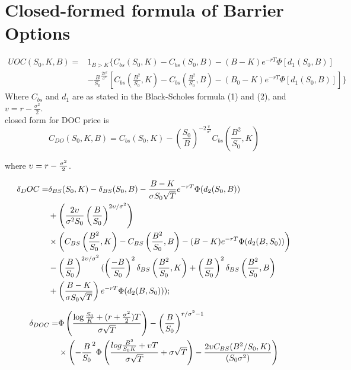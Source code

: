 \documentclass[11pt,a4paper,fleqn,draft]{article}
\begin{document}
\section{Closed-formed formula of Barrier Options}

\begin{equation}
\begin{aligned}
UOC(S_0,K,B) ={} &1_{B>K} \{ C_{bs}(S_0, K)-C_{bs}(S_0,B)-(B-K)e^{-rT}\Phi[d_{1}(S_0,B)] \\
      & -\frac{B}{S_0}^{\frac{2v^2}{\sigma^2}}\left[C_{bs}(\frac{B^2}{S_0}, K)-C_{bs}(\frac{B^2}{S_0}, B) -(B_0-K)e^{-rT}\Phi[d_{1}(S_0,B)]\right]\}
\end{aligned}
\end{equation}
Where $C_{bs}$ and $d_{1}$ are as stated in the Black-Scholes formula (1) and (2), and $v=r-\frac{\sigma^2}{2}$.\\

closed form for DOC price is 
$$C_{DO}(S_0,K,B) = C_{bs}(S_0, K) -  (\frac{S_0}{B})^{ -2\frac{\upsilon}{\sigma^2}}C_{bs}(\frac{B^2}{S_0}, K)$$

where $\upsilon = r - {\sigma^2 \over 2}$.

\begin{align*}
\delta_DOC =& \delta_{BS}(S_0, K) - \delta_{BS}(S_0, B)-{B - K\over \sigma S_0 \sqrt{T}}e^{-rT}\Phi(d_2(S_0,B))\\
&+ \left({2\upsilon\over \sigma^2 S_0} \left({B \over S_0}\right)^{ 2\upsilon / \sigma^2} \right)\\
&\times \left(C_{BS}\left({B^2 \over S_0}, K\right) - C_{BS}\left({B^2\over S_0}, B\right) - (B - K)e^{-rT}\Phi(d_2(B, S_0))\right)\\
&-\left({B \over S_0}\right)^{ 2\upsilon / \sigma^2}(\left({-B \over S_0}\right)^2\delta_{BS}\left({B^2 \over S_0}, K\right) + \left({B\over S_0}\right)^2\delta_{BS}\left({B^2 \over S_0}, B\right)\\
&+ \left({B - K \over \sigma S_0\sqrt{T}}\right)e^{-rT}\Phi(d_2(B, S_0)));
\end{align*}

\begin{align*}
\delta_{DOC} =& \Phi\left({\log{S_0 \over K} + (r + {\sigma^2 \over 2})T \over \sigma\sqrt{T}}\right)- \left({B\over S_0}\right)^{r /\sigma^2 - 1}\\
&\times \left(-{B\over S_0}^2 \Phi\left({log{B^2 \over S_0K} + \upsilon T \over \sigma \sqrt{T}} + \sigma \sqrt{T}\right) - {2 \upsilon C_{BS}(B^2 / S_0, K) \over (S_0\sigma^2)}\right)
\end{align*}
\end{document}
